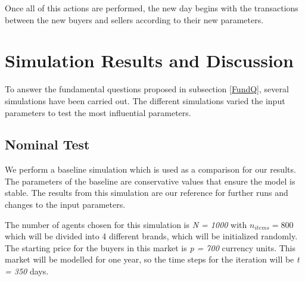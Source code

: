 \documentclass[12pt]{article}
\begin{document}
Once all of this actions are performed, the new day begins with the transactions between the new buyers and sellers according to their new parameters.




\newpage
\section{Simulation Results and Discussion}
\label{Sim_Dis}

To answer the fundamental questions proposed in subsection \ref{FundQ}, several simulations have been carried out. The different simulations varied the input parameters to test the most influential parameters.

\subsection{Nominal Test}

We perform a baseline simulation which is used as a comparison for our results. The parameters of the baseline are conservative values that ensure the model is stable. The results from this simulation are our reference for further runs and changes to the input parameters. 

The number of agents chosen for this simulation is \textit{N = 1000} with \textit{$n_{items} = 800$} which will be divided into 4 different brands, which will be initialized randomly. The starting price for the buyers in this market is \textit{p = 700} currency units. This market will be modelled for one year, so the time steps for the iteration will be \textit{t = 350} days. 
\end{document}
